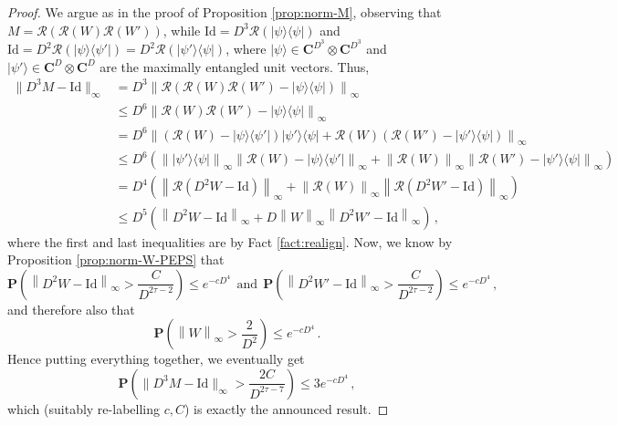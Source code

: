 \documentclass{amsart}
\newcommand{\C}{\mathbf{C}}
\renewcommand{\P}{\mathbf{P}}
\renewcommand{\leq}{\leqslant}
\newcommand{\Id}{\mathrm{Id}}
\newcommand{\ketbra}[2]{| #1 \rangle\!\langle #2 |}
\newcommand{\ket}[1]{| #1 \rangle}
\begin{document}
\begin{proof}
    We argue as in the proof of Proposition \ref{prop:norm-M}, observing that $M=\mathcal{R}\left(\mathcal{R}(W)\mathcal{R}(W')\right)$, while $\Id=D^3\mathcal{R}(\ketbra{\psi}{\psi})$ and $\Id=D^2\mathcal{R}(\ketbra{\psi}{\psi'})=D^2\mathcal{R}(\ketbra{\psi'}{\psi})$, where $\ket{\psi}\in\C^{D^3}\otimes\C^{D^3}$ and $\ket{\psi'}\in\C^D\otimes\C^D$ are the maximally entangled unit vectors. Thus,
    \begin{align*}
        \|D^3M-\Id\|_{\infty} & = D^3 \left\| \mathcal{R}\left(\mathcal{R}(W)\mathcal{R}(W')-\ketbra{\psi}{\psi}\right) \right\|_{\infty}                                                                                                                                     \\
                              & \leq D^6 \left\| \mathcal{R}(W)\mathcal{R}(W')-\ketbra{\psi}{\psi} \right\|_{\infty}                                                                                                                                                          \\
                              & = D^6 \left\| \left(\mathcal{R}(W)-\ketbra{\psi}{\psi'}\right) \ketbra{\psi'}{\psi} + \mathcal{R}(W) \left(\mathcal{R}(W')-\ketbra{\psi'}{\psi}\right) \right\|_{\infty}                                                                      \\
                              & \leq D^6 \left( \left\|\ketbra{\psi'}{\psi} \right\|_{\infty} \left\| \mathcal{R}(W)-\ketbra{\psi}{\psi'} \right\|_{\infty} + \left\| \mathcal{R}(W) \right\|_{\infty} \left\| \mathcal{R}(W')-\ketbra{\psi'}{\psi} \right\|_{\infty} \right) \\
                              & = D^4 \left( \left\| \mathcal{R}(D^2W-\Id) \right\|_{\infty} + \left\| \mathcal{R}(W) \right\|_{\infty} \left\| \mathcal{R}(D^2W'-\Id) \right\|_{\infty} \right)                                                                              \\
                              & \leq D^5 \left( \left\| D^2W-\Id \right\|_{\infty} + D \left\| W \right\|_{\infty} \left\| D^2W'-\Id \right\|_{\infty} \right)  \, ,
    \end{align*}
    where the first and last inequalities are by Fact \ref{fact:realign}. Now, we know by Proposition \ref{prop:norm-W-PEPS} that
    \[ \P\left( \left\| D^2W-\Id \right\|_{\infty} > \frac{C}{D^{2\tau -2}} \right) \leq e^{-cD^4}\ \ \text{and}\ \ \P\left( \left\| D^2W'-\Id \right\|_{\infty} > \frac{C}{D^{2\tau -2}} \right) \leq e^{-cD^4} \, , \]
    and therefore also that
    \[ \P\left( \left\| W \right\|_{\infty} > \frac{2}{D^2} \right) \leq e^{-cD^4} \, . \]
    Hence putting everything together, we eventually get
    \[ \P\left( \|D^3M-\Id\|_{\infty} > \frac{2C}{D^{2\tau-7}} \right) \leq 3e^{-cD^4} \, , \]
    which (suitably re-labelling $c,C$) is exactly the announced result.
\end{proof}
\end{document}
